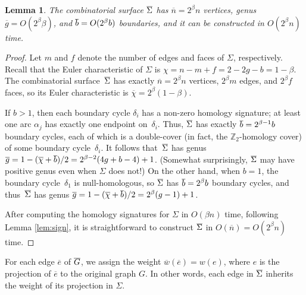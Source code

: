 \documentclass[11pt,twoside]{article}
\def\Z{\mathbb{Z}}
\def\dualarc{\alpha}
\def\Sigmabar{\overline{\smash{\Sigma}\vphantom{t}}}
\def\Gbar{\overline{\smash{G}\vphantom{t}}}
\def\bbar{\overline{\smash{b}\vphantom{t}}}
\def\nbar{\overline{n}}
\def\gbar{\overline{g}}
\def\wbar{\overline{w}}
\def\ebar{\overline{e}}
\def\chibar{\overline{\chi}}
\newtheorem{lemma}[theorem]{Lemma}
\begin{document}
\begin{lemma}
\label{lem:cover-cxy}
The combinatorial surface $\Sigmabar$ has $\nbar = 2^\beta n$ vertices, genus $\gbar = O(2^\beta \beta)$, and $\bbar = O(2^\beta b)$ boundaries, and it can be constructed in $O(2^\beta n)$ time.
\end{lemma}

\begin{proof}
Let $m$ and $f$ denote the number of edges and faces of $\Sigma$, respectively.  Recall that the Euler characteristic of $\Sigma$ is $\chi = n - m + f = 2 - 2g - b = 1-\beta$.  The combinatorial surface~$\Sigmabar$ has exactly $\nbar = 2^\beta n$ vertices, $2^\beta m$ edges, and $2^\beta f$ faces, so its Euler characteristic is $\chibar = 2^\beta (1-\beta)$.

If $b>1$, then each boundary cycle $\delta_i$ has a non-zero homology signature; at least one arc $\dualarc_j$ has exactly one endpoint on~$\delta_i$.  Thus, $\Sigmabar$ has exactly $\bbar = 2^{\beta-1} b$ boundary cycles, each of which is a double-cover (in fact, the $\Z_2$-homology cover) of some boundary cycle~$\delta_i$.  It follows that~$\Sigmabar$ has genus $\gbar = 1-(\chibar+\bbar)/2 = {2^{\beta-2} ({4g+b-4}) + 1}$.  (Somewhat surprisingly, $\Sigmabar$ may have positive genus even when $\Sigma$ does not!)  On the other hand, when $b=1$, the boundary cycle~$\delta_1$ is null-homologous, so $\Sigmabar$ has $\bbar = 2^\beta b$ boundary cycles, and thus~$\Sigmabar$ has genus $\gbar = {1-(\chibar+\bbar)/2} =  {2^\beta (g-1) + 1}$.

After computing the homology signatures for $\Sigma$ in $O(\beta n)$ time, following Lemma \ref{lem:sign}, it is straightforward to construct $\Sigmabar$ in $O(\nbar) = O(2^\beta n)$ time.
\end{proof}

\note{Not so formal about $\wbar$}
For each edge $\ebar$ of $\Gbar$, we assign the weight $\wbar(\ebar) = w(e)$, where $e$ is the projection of $\ebar$ to the original graph $G$.  In other words, each  edge in $\Sigmabar$ inherits the weight of its projection in $\Sigma$.
\end{document}
